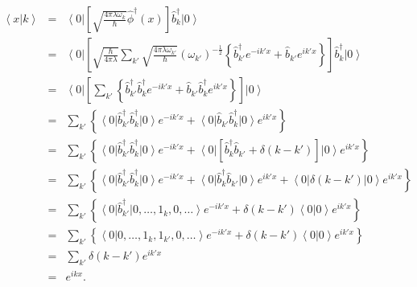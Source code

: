 \begin{eqnarray}
\left\langle x\right| \left. k\right> & = &\left\langle 0\right|
\left[ \sqrt{\frac{4\pi\lambda\omega_{k}}{\hbar}}\hat{\phi}^{\dagger}\left(
x\right) \right] \hat{b}_{k}^{\dagger}\left| 0\right> \\
& = &\left\langle 0\right| \left[ \sqrt{\frac{\hbar}{4\pi\lambda}}\sum_{k'}\sqrt{\frac{4\pi\lambda\omega_{k'}}{\hbar}}\left( \omega_{k'}\right) ^{-\frac{1}{2}}\left\{ \hat{b}_{k'}^{\dagger}e^{-ik'x}+\hat{b}_{k'}e^{ik'x}\right\} \right] \hat{b}_{k}^{\dagger}\left| 0\right> \\
& = &\left\langle 0\right| \left[ \sum_{k'}\left\{ \hat{b}_{k'}^{\dagger}\hat{b}_{k}^{\dagger}e^{-ik'x}+\hat{b}_{k'}\hat{b}_{k}^{\dagger}e^{ik'x}\right\} \right] \left| 0\right> \\
& = &\sum_{k'}\left\{ \left\langle 0\right| \hat{b}_{k'}^{\dagger}\hat{b}_{k}^{\dagger}\left| 0\right> e^{-ik'x}+\left\langle 0\right| \hat{b}_{k'}\hat{b}_{k}^{\dagger}\left| 0\right> e^{ik'x}\right\} \\
& = &\sum_{k'}\left\{ \left\langle 0\right| \hat{b}_{k'}^{\dagger}\hat{b}_{k}^{\dagger}\left| 0\right> e^{-ik'x}+\left\langle 0\right| \left[ \hat{b}_{k}^{\dagger}\hat{b}_{k'}+\delta(k-k') \right] \left| 0\right> e^{ik'x}\right\} \\
& = &\sum_{k'}\left\{ \left\langle 0\right| \hat{b}_{k'}^{\dagger}\hat{b}_{k}^{\dagger}\left| 0\right> e^{-ik'x}+\left\langle 0\right| \hat{b}_{k}^{\dagger}\hat{b}_{k'}\left| 0\right> e^{ik'x}+\left\langle 0\right| \delta(k-k') \left| 0\right> e^{ik'x}\right\} \\
& = &\sum_{k'}\left\{ \left\langle 0\right| \hat{b}_{k'}^{\dagger}\left| 0,\dots,1_{k},0,\dots\right> e^{-ik'x}+\delta(k-k') \left\langle 0\right| \left. 0\right> e^{ik'x}\right\} \\
& = &\sum_{k'}\left\{ \left\langle 0\right| \left. 0,\dots,1_{k},1_{k'},0,\dots\right> e^{-ik'x}+\delta(k-k') \left\langle 0\right| \left. 0\right> e^{ik'x}\right\} \\
& = &\sum_{k'}\delta(k-k') e^{ik'x}\\
& = &e^{ikx} .
\end{eqnarray}


